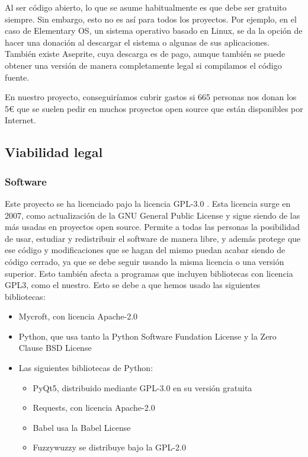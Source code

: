 Al ser código abierto, lo que se asume habitualmente es que debe ser gratuito siempre. Sin embargo, esto no es así para todos los proyectos. Por ejemplo, en el caso de Elementary OS, un sistema operativo basado en Linux, se da la opción de hacer una donación al descargar el sistema o algunas de sus aplicaciones. También existe Aseprite, cuya descarga es de pago, aunque también se puede obtener una versión de manera completamente legal si compilamos el código fuente.

En nuestro proyecto, conseguiríamos cubrir gastos si 665 personas nos donan los 5€ que se suelen pedir en muchos proyectos open source que están disponibles por Internet.

\subsection{Viabilidad legal}
\subsubsection{Software}
Este proyecto se ha licenciado pajo la licencia GPL-3.0 \cite{gpl3}. Esta licencia surge en 2007, como actualización de la GNU General Public License y sigue siendo de las más usadas en proyectos open source. Permite a todas las personas la posibilidad de usar, estudiar y redistribuir el software de manera libre, y además protege que ese código y modificaciones que se hagan del mismo puedan acabar siendo de código cerrado, ya que se debe seguir usando la misma licencia o una versión superior. Esto también afecta a programas que incluyen bibliotecas con licencia GPL3, como el nuestro. Esto se debe a que hemos usado las siguientes bibliotecas:
\begin{itemize}
    \item Mycroft, con licencia Apache-2.0 \cite{apache2}
    \item Python, que usa tanto la Python Software Fundation License y la Zero Clause BSD License \cite{pythonlicense}
    \item Las siguientes bibliotecas de Python:
    \begin{itemize}
        \item PyQt5, distribuido mediante GPL-3.0 en su versión gratuita
        \item Requests, con licencia Apache-2.0
        \item Babel usa la Babel License \cite{babel}
        \item Fuzzywuzzy se distribuye bajo la GPL-2.0 \cite{gpl2}
    \end{itemize}
\end{itemize}

